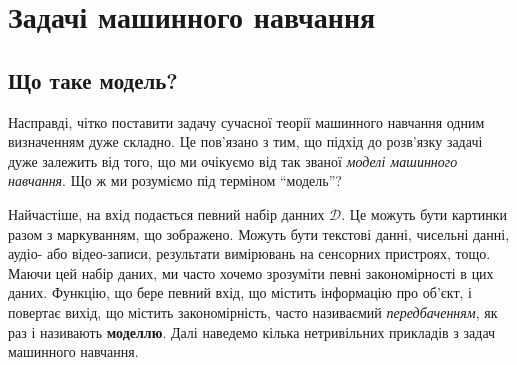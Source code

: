 \usetikzlibrary{positioning, arrows.meta}

\chapter{Задачі машинного навчання}

\section{Що таке модель?}

Насправді, чітко поставити задачу сучасної теорії машинного навчання одним
визначенням дуже складно. Це пов'язано з тим, що підхід до розв'язку задачі дуже
залежить від того, що ми очікуємо від так званої \textit{моделі машинного
навчання}. Що ж ми розуміємо під терміном ``модель''?

Найчастіше, на вхід подається певний набір данних $\mathcal{D}$. Це можуть бути
картинки разом з маркуванням, що зображено. Можуть бути текстові данні, чисельні
данні, аудіо- або відео-записи, результати вимірювань на сенсорних пристроях,
тощо. Маючи цей набір даних, ми часто хочемо зрозуміти певні закономірності в
цих даних. Функцію, що бере певний вхід, що містить інформацію про об'єкт, і
повертає вихід, що містить закономірність, часто називаємий
\textit{передбаченням}, як раз і називають \textbf{моделлю}. Далі наведемо
кілька нетривільних прикладів з задач машинного навчання.

